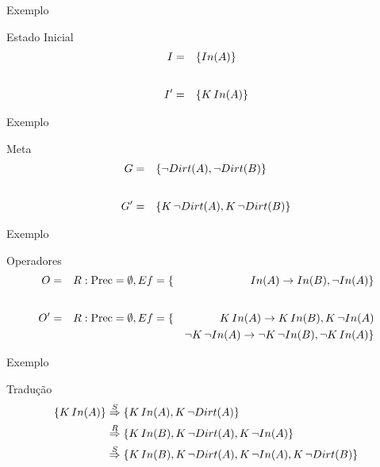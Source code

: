 \begin{frame}{Exemplo}
     \begin{block}{Estado Inicial}
        \begin{align*}
                I = \quad  & \{ In(A)\} \\\intertext{}
                I' = \quad  & \{ K\, In(A) \} \\
        \end{align*}
    \end{block}    
\end{frame}

\begin{frame}{Exemplo}
     \begin{block}{Meta}
        \begin{align*}
                G = \quad  & \{ \lnot Dirt(A),\lnot Dirt(B)  \} \\\intertext{}
                G' = \quad  & \{ K\, \lnot Dirt(A),K\, \lnot Dirt(B)  \} \\
        \end{align*}
    \end{block}    
\end{frame}

\begin{frame}{Exemplo}
     \begin{block}{Operadores}
        \begin{align*}
                O  = \quad & R: \text{Prec} = \emptyset, Ef= \{& In(A) \rightarrow In(B),\lnot In(A) \} \\ \intertext{}
                O' = \quad & R: \text{Prec} = \emptyset, Ef= \{& K\, In(A) \rightarrow K\, In(B), K\, \lnot In(A)  \\
                          &                                    &\lnot K\,\lnot In(A) \rightarrow \lnot K\,\lnot In(B), \lnot K\, In(A) \} \\
        \end{align*}
    \end{block}    
\end{frame}

\begin{frame}{Exemplo}
    \begin{block}{Tradução}
        \begin{align*}
            \{ K\, In(A)  \} & \overset{S}{\Rightarrow} \{ K\, In(A), K\,\lnot Dirt(A) \} \\
                            & \overset{R}{\Rightarrow} \{ K\, In(B), K\,\lnot Dirt(A), K\, \lnot In(A) \} \\
                            & \overset{S}{\Rightarrow} \{ K\, In(B), K\,\lnot Dirt(A), K\, \lnot In(A), K\,\lnot Dirt(B) \} 
        \end{align*}
\end{block}
    
    
\end{frame}

